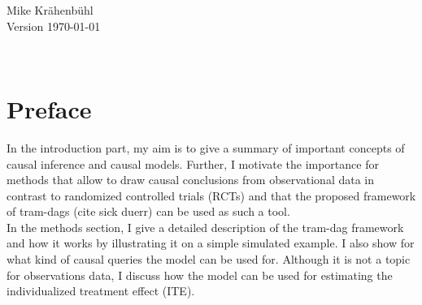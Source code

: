 \documentclass[11pt,a4paper,twoside]{book}
\begin{document}


\graphicspath{{./figure/}}
\setcounter{tocdepth}{1}

\thispagestyle{empty}
\begin{center}


	\vspace*{6cm}{\bfseries\Huge
	Modeling Functional Relationships in Causal Graphs and Estimating Individualized Interventions:\\[5mm]
	Neural Causal Models (TRAM-DAGs) and Conditional Average Treatment Effects
	}


  \vfill
  \rm

  \LARGE
  Mike Kr{\"a}henb{\"u}hl\\[12mm]
  
  \normalsize
  Version \today
\end{center}
\newpage
\thispagestyle{empty}~
\newpage
{}

\thispagestyle{plain}
\tableofcontents
{}

\chapter*{Preface}
\thispagestyle{plain}

In the introduction part, my aim is to give a summary of 
important concepts of causal inference and causal models. Further, 
I motivate the importance for methods that allow to draw causal 
conclusions from observational data in contrast to randomized controlled
trials (RCTs) and that the proposed framework of tram-dags (cite sick duerr)
 can be used as such a tool. \\ 
 
In the methods section, I give a detailed description of the tram-dag framework 
and how it works by illustrating it on a simple simulated example. 
I also show for what kind of causal queries the model can be used for. 
Although it is not a topic for observations data, I discuss how the model can be 
used for estimating the individualized treatment effect (ITE).\\ 
\end{document}
